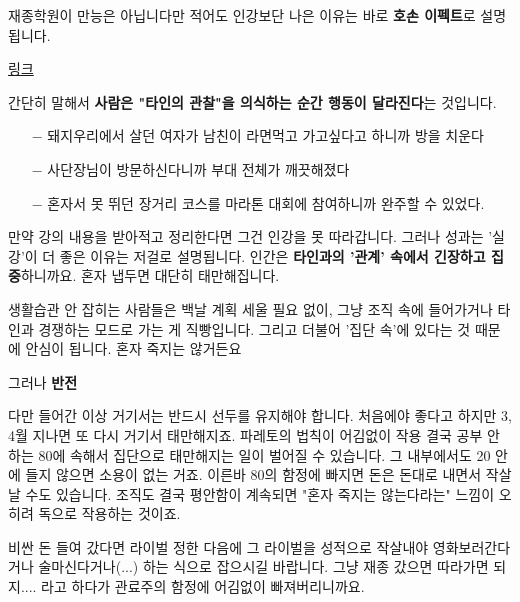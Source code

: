 \vspace{5mm}

재종학원이 만능은 아닙니다만 적어도 인강보단 나은 이유는
바로 \textbf{호손 이펙트}로 설명됩니다.
\vspace{5mm}

\href{https://ko.wikipedia.org/wiki/%ED%98%B8%EC%86%90_%ED%9A%A8%EA%B3%BC}{링크}
\vspace{5mm}

간단히 말해서 \textbf{사람은 "타인의 관찰"을 의식하는 순간 행동이 달라진다}는 것입니다.
\vspace{5mm}
\begin{itemize}
    \item [$-$] 돼지우리에서 살던 여자가 남친이 라면먹고 가고싶다고 하니까 방을 치운다
    \item [$-$] 사단장님이 방문하신다니까 부대 전체가 깨끗해졌다
    \item [$-$] 혼자서 못 뛰던 장거리 코스를 마라톤 대회에 참여하니까 완주할 수 있었다.
\end{itemize}
\vspace{5mm}

만약 강의 내용을 받아적고 정리한다면 그건 인강을 못 따라갑니다.
그러나 성과는 '실강'이 더 좋은 이유는 저걸로 설명됩니다.
인간은 \textbf{타인과의 '관계' 속에서 긴장하고 집중}하니까요. 혼자 냅두면 대단히 태만해집니다.
\vspace{5mm}

생활습관 안 잡히는 사람들은 백날 계획 세울 필요 없이,
그냥 조직 속에 들어가거나 타인과 경쟁하는 모드로 가는 게 직빵입니다.
그리고 더불어 '집단 속'에 있다는 것 때문에 안심이 됩니다. 혼자 죽지는 않거든요
\vspace{5mm}

그러나 \textbf{반전}
\vspace{5mm}

다만 들어간 이상 거기서는 반드시 선두를 유지해야 합니다.
처음에야 좋다고 하지만 3, 4월 지나면 또 다시 거기서 태만해지죠. 파레토의 법칙이 어김없이 작용
결국 공부 안 하는 80에 속해서 집단으로 태만해지는 일이 벌어질 수 있습니다.
그 내부에서도 20 안에 들지 않으면 소용이 없는 거죠.
이른바 80의 함정에 빠지면 돈은 돈대로 내면서 작살날 수도 있습니다.
조직도 결국 평안함이 계속되면 "혼자 죽지는 않는다라는" 느낌이 오히려 독으로 작용하는 것이죠.
\vspace{5mm}

비싼 돈 들여 갔다면 라이벌 정한 다음에 그 라이벌을 성적으로 작살내야 영화보러간다거나 술마신다거나(...) 하는 식으로 잡으시길 바랍니다.
그냥 재종 갔으면 따라가면 되지.... 라고 하다가 관료주의 함정에 어김없이 빠져버리니까요.
\vspace{5mm}








